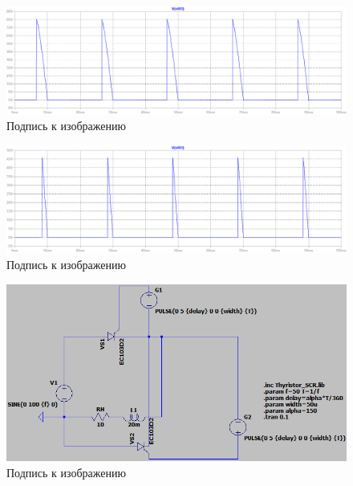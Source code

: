 \documentclass[a4paper, 12pt]{article}
\begin{document}
    \begin{figure}[H]
        \centering
        \includegraphics[scale=0.45]{a120.png}
        \captionsetup{skip=0pt}
        \caption{Подпись к изображению}
        \label{fig:a120}
    \end{figure}
    \begin{figure}[H]
        \centering
        \includegraphics[scale=0.45]{a150.png}
        \captionsetup{skip=0pt}
        \caption{Подпись к изображению}
        \label{fig:a150}
    \end{figure}


    \begin{figure}[H]
        \centering
        \includegraphics[scale=0.5]{scheme2.png}
        \captionsetup{skip=0pt}
        \caption{Подпись к изображению}
        \label{fig:scheme2}
    \end{figure}
\end{document}
